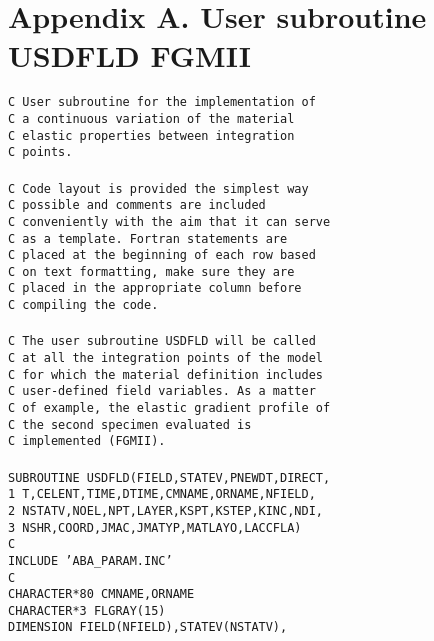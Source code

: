 \section*{Appendix A. User subroutine USDFLD FGMII}
\label{}
\noindent
\texttt{C User subroutine for the implementation of\\
C a continuous variation of the material\\
C elastic properties between integration \\
C points.\\\\
C Code layout is provided the simplest way \\
C possible and comments are included\\
C conveniently with the aim that it can serve\\
C as a template. Fortran statements are \\
C placed at the beginning of each row based\\
C on text formatting, make sure they are\\
C placed in the appropriate column before\\
C compiling the code.\\\\
C The user subroutine USDFLD will be called \\
C at all the integration points of the model \\ 
C for which the material definition includes\\
C user-defined field variables. As a matter\\
C of example, the elastic gradient profile of\\
C the second specimen evaluated is \\
C implemented (FGMII).\\\\
SUBROUTINE USDFLD(FIELD,STATEV,PNEWDT,DIRECT,\\
1 T,CELENT,TIME,DTIME,CMNAME,ORNAME,NFIELD,\\
2 NSTATV,NOEL,NPT,LAYER,KSPT,KSTEP,KINC,NDI,\\
3 NSHR,COORD,JMAC,JMATYP,MATLAYO,LACCFLA)\\
C\\
INCLUDE 'ABA\_PARAM.INC'\\
C\\
CHARACTER*80 CMNAME,ORNAME\\
CHARACTER*3  FLGRAY(15)\\
DIMENSION FIELD(NFIELD),STATEV(NSTATV),\\
}
